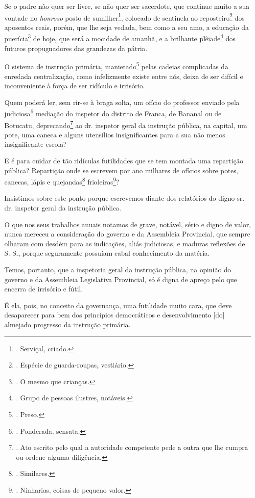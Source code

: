 Se o padre não quer ser livre, se não quer ser sacerdote, que continue
muito a sua vontade no \emph{honroso} posto de sumilher\footnote{.
  Serviçal, criado.}, colocado de sentinela ao reposteiro\footnote{.
  Espécie de guarda-roupas, vestiário.} dos aposentos reais, porém, que
lhe seja vedada, bem como a seu amo, a educação da puerícia\footnote{. O
  mesmo que crianças.} de hoje, que será a mocidade de amanhã, e a
brilhante plêiade\footnote{. Grupo de pessoas ilustres, notáveis.} dos
futuros propugnadores das grandezas da pátria.

O sistema de instrução primária, manietado\footnote{. Preso.} pelas
cadeias complicadas da enredada centralização, como infelizmente existe
entre nós, deixa de ser difícil e inconveniente à força de ser ridículo
e irrisório.

Quem poderá ler, sem rir-se à braga solta, um ofício do professor
enviado pela judiciosa\footnote{. Ponderada, sensata.} mediação do
inspetor do distrito de Franca, de Bananal ou de Botucatu,
deprecando\footnote{. Ato escrito pelo qual a autoridade competente pede
  a outra que lhe cumpra ou ordene alguma diligência.} ao dr. inspetor
geral da instrução pública, na capital, um pote, uma caneca e alguns
utensílios insignificantes para a sua não menos insignificante escola?

E é para cuidar de tão ridículas futilidades que se tem montada uma
repartição pública? Repartição onde se escrevem por ano milhares de
ofícios sobre potes, canecas, lápis e quejandas\footnote{. Similares.}
frioleiras\footnote{. Ninharias, coisas de pequeno valor.}?

Insistimos sobre este ponto porque escrevemos diante dos relatórios do
digno sr. dr. inspetor geral da instrução pública.

O que nos seus trabalhos anuais notamos de grave, notável, sério e digno
de valor, nunca mereceu a consideração do governo e da Assembleia
Provincial, que sempre olharam com desdém para as indicações, aliás
judiciosas, e maduras reflexões de S. S., porque seguramente possuíam
cabal conhecimento da matéria.

Temos, portanto, que a inspetoria geral da instrução pública, na opinião
do governo e da Assembleia Legislativa Provincial, só é digna de apreço
pelo que encerra de irrisório e fútil.

É ela, pois, no conceito da governança, uma futilidade muito cara, que
deve desaparecer para bem dos princípios democráticos e desenvolvimento
{[}do{]} almejado progresso da instrução primária.

